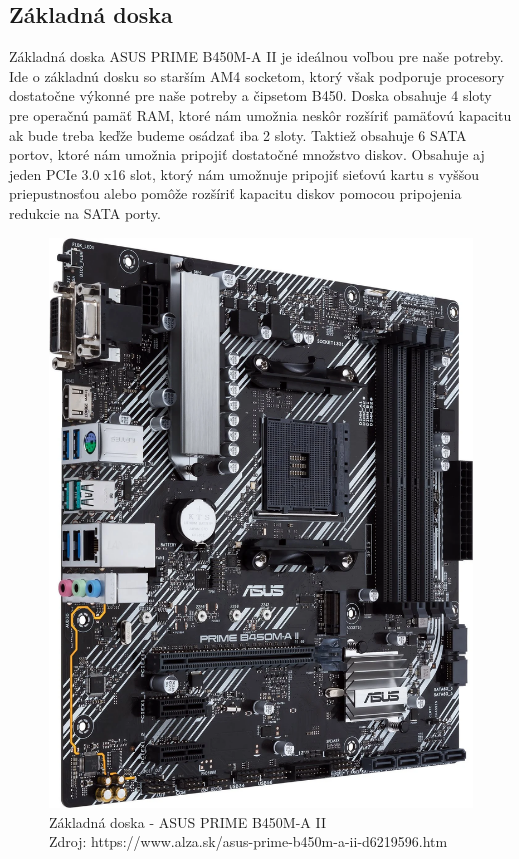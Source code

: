 \documentclass[12pt,oneside,slovak,a4paper]{article}
\begin{document}
\subsection{Základná doska}
Základná doska ASUS PRIME B450M-A II je ideálnou voľbou pre naše potreby. Ide o základnú dosku so starším AM4 socketom, ktorý však podporuje procesory dostatočne výkonné pre naše potreby a čipsetom B450. Doska obsahuje 4 sloty pre operačnú pamäť RAM, ktoré nám umožnia neskôr rozšíriť pamäťovú kapacitu ak bude treba keďže budeme osádzať iba 2 sloty. Taktiež obsahuje 6 SATA portov, ktoré nám umožnia pripojiť dostatočné množstvo diskov. Obsahuje aj jeden PCIe 3.0 x16 slot, ktorý nám umožnuje pripojiť sieťovú kartu s vyššou priepustnosťou alebo pomôže rozšíriť kapacitu diskov pomocou pripojenia redukcie na SATA porty.

\begin{figure}[H]
	\centering
	\captionsetup{justification=centering,margin=2cm}
	\includegraphics[scale=0.15]{./images/motherboard.png} %
	\centering
	\caption{Základná doska - ASUS PRIME B450M-A II \\ Zdroj: https://www.alza.sk/asus-prime-b450m-a-ii-d6219596.htm}
\end{figure}
\end{document}
